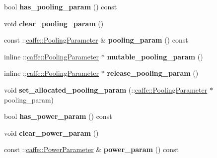 \begin{DoxyCompactItemize}
bool {\bfseries has\+\_\+pooling\+\_\+param} () const
\item 
\mbox{\label{classcaffe_1_1_layer_parameter_a99b7da91c0e22d2c56dfecba097cceef}} 
void {\bfseries clear\+\_\+pooling\+\_\+param} ()
\item 
\mbox{\label{classcaffe_1_1_layer_parameter_aa1da832a44b6a50a92b13b8bb4b87c5c}} 
const \+::\mbox{\hyperlink{classcaffe_1_1_pooling_parameter}{caffe\+::\+Pooling\+Parameter}} \& {\bfseries pooling\+\_\+param} () const
\item 
\mbox{\label{classcaffe_1_1_layer_parameter_a7579e343b12dbf959569b3cd982f47c0}} 
inline \+::\mbox{\hyperlink{classcaffe_1_1_pooling_parameter}{caffe\+::\+Pooling\+Parameter}} $\ast$ {\bfseries mutable\+\_\+pooling\+\_\+param} ()
\item 
\mbox{\label{classcaffe_1_1_layer_parameter_a5349d3fb83ce5192b2f4070f69db8206}} 
inline \+::\mbox{\hyperlink{classcaffe_1_1_pooling_parameter}{caffe\+::\+Pooling\+Parameter}} $\ast$ {\bfseries release\+\_\+pooling\+\_\+param} ()
\item 
\mbox{\label{classcaffe_1_1_layer_parameter_aa9d3070b7c30a8183e6c69873ee52850}} 
void {\bfseries set\+\_\+allocated\+\_\+pooling\+\_\+param} (\+::\mbox{\hyperlink{classcaffe_1_1_pooling_parameter}{caffe\+::\+Pooling\+Parameter}} $\ast$pooling\+\_\+param)
\item 
\mbox{\label{classcaffe_1_1_layer_parameter_a6f4f4513009f0fe5203eab8606b0f649}} 
bool {\bfseries has\+\_\+power\+\_\+param} () const
\item 
\mbox{\label{classcaffe_1_1_layer_parameter_a49a7acb335a5552254830e196618c9f3}} 
void {\bfseries clear\+\_\+power\+\_\+param} ()
\item 
\mbox{\label{classcaffe_1_1_layer_parameter_a19736fef3a0ebb63f2711e06cf7ac85d}} 
const \+::\mbox{\hyperlink{classcaffe_1_1_power_parameter}{caffe\+::\+Power\+Parameter}} \& {\bfseries power\+\_\+param} () const
\item 

\end{DoxyCompactItemize}
